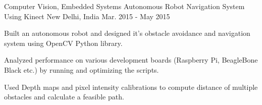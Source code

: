 \begin{cventries}
{    }
  \cventry
    {Computer Vision, Embedded Systems}
    {Autonomous Robot Navigation System Using Kinect}
    {New Delhi, India}
    {Mar. 2015 - May 2015}
    {
      \begin{cvitems}
        \item {Built an autonomous robot and designed it’s obstacle avoidance and navigation system using OpenCV Python library.}
        \item {Analyzed performance on various development boards (Raspberry Pi, BeagleBone Black etc.) by running and optimizing the scripts.}
        \item {Used Depth maps and pixel intensity calibrations to compute distance of multiple obstacles and calculate a feasible path.}
      \end{cvitems} 
    }
\end{cventries}

